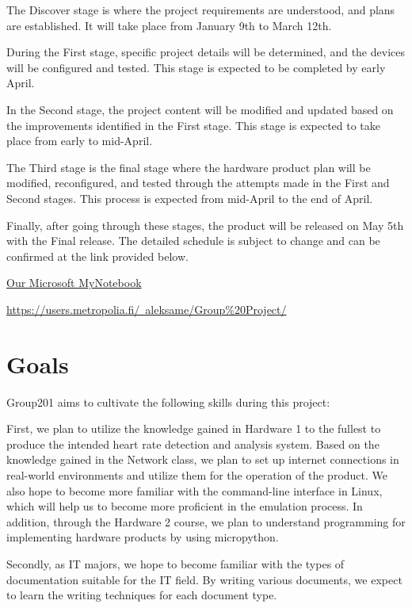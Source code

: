 \documentclass{article}
\begin{document}
The Discover stage is where the project requirements are understood, and plans are established. It will take place from January 9th to March 12th.

During the First stage, specific project details will be determined, and the devices will be configured and tested. This stage is expected to be completed by early April.

In the Second stage, the project content will be modified and updated based on the improvements identified in the First stage. This stage is expected to take place from early to mid-April.

The Third stage is the final stage where the hardware product plan will be modified, reconfigured, and tested through the attempts made in the First and Second stages. This process is expected from mid-April to the end of April.

Finally, after going through these stages, the product will be released on May 5th with the Final release. The detailed schedule is subject to change and can be confirmed at the link provided below.

\href{https://teams.microsoft.com/\_#/apps/1c256a65-83a6-4b5c-9ccf-78f8afb6f1e8/sections/MyNotebook }{Our Microsoft MyNotebook}


\href{https://users.metropolia.fi/~aleksame/Group\%20Project/ }{https://users.metropolia.fi/~aleksame/Group\%20Project/}



\section{Goals}
Group201 aims to cultivate the following skills during this project:



First, we plan to utilize the knowledge gained in Hardware 1 to the fullest to produce the intended heart rate detection and analysis system. Based on the knowledge gained in the Network class, we plan to set up internet connections in real-world environments and utilize them for the operation of the product. We also hope to become more familiar with the command-line interface in Linux, which will help us to become more proficient in the emulation process. In addition, through the Hardware 2 course, we plan to understand programming for implementing hardware products by using micropython.



Secondly, as IT majors, we hope to become familiar with the types of documentation suitable for the IT field. By writing various documents, we expect to learn the writing techniques for each document type.
\end{document}
